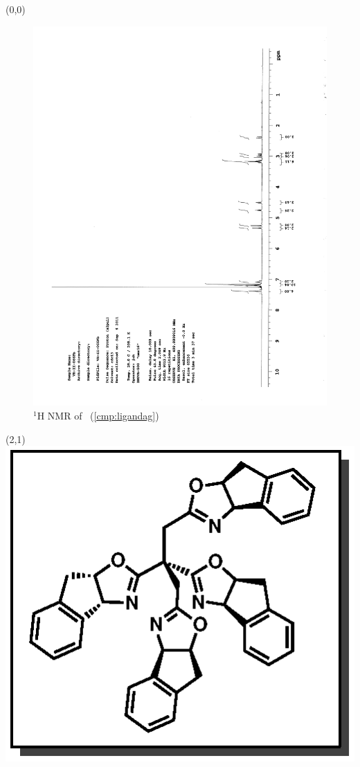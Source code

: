 \begin{textblock}{20}(0,0)
\begin{figure}[htb]
\caption{$^1$H NMR of \CMPligandag\ (\ref{cmp:ligandag})}
\includegraphics[scale=0.75, trim = 0mm 0mm 0mm 5mm,
clip]{chp_asymmetric/images/nmr/ligandagH}
\vspace{-100pt}
\end{figure}
\end{textblock}
\begin{textblock}{1}(2,1)
\includegraphics[scale=0.8, angle=90]{chp_asymmetric/images/ligandag}
\end{textblock}
